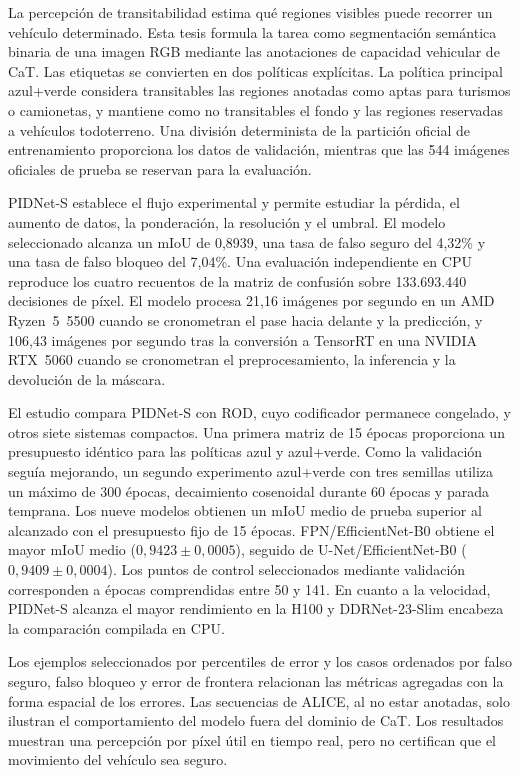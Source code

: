 \documentclass[12pt,a4paper]{report}
\begin{document}
La percepción de transitabilidad estima qué regiones visibles puede recorrer
un vehículo determinado. Esta tesis formula la tarea como segmentación
semántica binaria de una imagen RGB mediante las anotaciones de capacidad
vehicular de CaT. Las etiquetas se convierten en dos políticas explícitas. La
política principal azul+verde considera transitables las regiones anotadas como
aptas para turismos o camionetas, y mantiene como no transitables el fondo y
las regiones reservadas a vehículos todoterreno. Una división determinista de
la partición oficial de entrenamiento proporciona los datos de validación,
mientras que las 544 imágenes oficiales de prueba se reservan para la
evaluación.

PIDNet-S establece el flujo experimental y permite estudiar la pérdida, el
aumento de datos, la ponderación, la resolución y el umbral. El modelo
seleccionado alcanza un mIoU de 0,8939, una
tasa de falso seguro del 4,32\% y una tasa de falso bloqueo del 7,04\%. Una
evaluación independiente en CPU reproduce los cuatro recuentos de la matriz de
confusión sobre 133.693.440 decisiones de píxel. El modelo procesa 21,16
imágenes por segundo en un AMD Ryzen~5~5500 cuando se cronometran el pase hacia
delante y la predicción, y 106,43 imágenes por segundo tras la conversión a
TensorRT en una NVIDIA RTX~5060 cuando se cronometran el preprocesamiento, la
inferencia y la devolución de la máscara.

El estudio compara PIDNet-S con ROD, cuyo codificador permanece congelado, y
otros siete sistemas compactos. Una primera matriz de 15 épocas proporciona
un presupuesto idéntico para las políticas azul y azul+verde. Como la
validación seguía mejorando, un segundo experimento azul+verde con tres
semillas utiliza un máximo de 300 épocas, decaimiento cosenoidal durante 60 épocas
y parada temprana. Los nueve modelos obtienen un mIoU medio de prueba superior
al alcanzado con el presupuesto fijo de 15 épocas. FPN/EfficientNet-B0 obtiene
el mayor mIoU medio ($0{,}9423\pm0{,}0005$), seguido de U-Net/EfficientNet-B0
($0{,}9409\pm0{,}0004$). Los puntos de control seleccionados mediante
validación corresponden a épocas comprendidas entre 50 y 141. En cuanto a la
velocidad, PIDNet-S alcanza el mayor rendimiento en la H100 y
DDRNet-23-Slim encabeza la comparación compilada en CPU.

Los ejemplos seleccionados por percentiles de error y los casos ordenados por
falso seguro, falso bloqueo y error de frontera relacionan las métricas
agregadas con la forma espacial de los errores. Las secuencias de ALICE, al no
estar anotadas, solo ilustran el comportamiento del modelo fuera del dominio de
CaT. Los resultados muestran una percepción por píxel útil en tiempo real, pero
no certifican que el movimiento del vehículo sea seguro.
\end{document}
